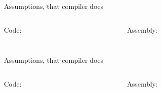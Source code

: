 \documentclass{panicsoftware-presentation}
\begin{document}
\begin{frame}{Assumptions, that compiler does}

\begin{columns}[t]

\begin{column}{0.58\linewidth}


\centerline{Code:}

\vfill

\inputminted[firstline=9, highlightlines={9}]{\myCpp}{examples/TBAA-simple-example.cpp}

\end{column}


\begin{column}{0.28\linewidth}

\centerline{Assembly:}

\vfill

\centering\inputminted[highlightlines={6}]{gas}{examples/TBAA-simple-example.asm}

\end{column}

\end{columns}

\end{frame}

\begin{frame}{Assumptions, that compiler does}

\begin{columns}[t]

\begin{column}{0.58\linewidth}


\centerline{Code:}

\vfill

\inputminted[firstline=5, highlightlines=5]{\myCpp}{examples/Non-TBAA-simple-example.cpp}

\end{column}


\begin{column}{0.28\linewidth}

\centerline{Assembly:}

\vfill

\centering\inputminted[highlightlines={6,7}]{gas}{examples/Non-TBAA-simple-asembly.asm}

\end{column}

\end{columns}

\end{frame}
\end{document}
